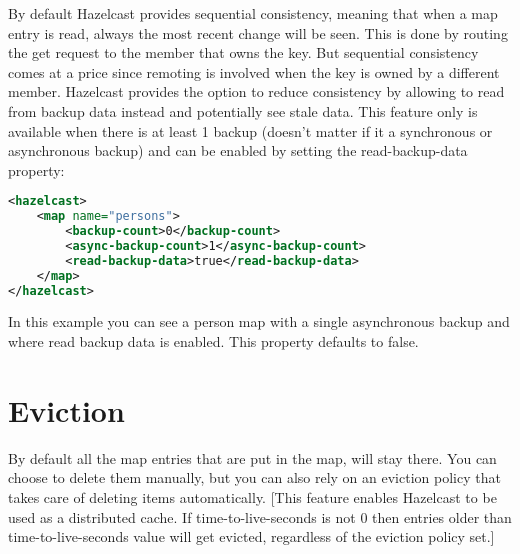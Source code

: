 By default Hazelcast provides sequential consistency, meaning that when a map entry is read, always the most recent change will be seen. This is done by routing the get request to the member that owns the key. But sequential consistency comes at a price since remoting is involved when the key is owned by a different member. Hazelcast provides the option to reduce consistency by allowing to read from backup data instead and potentially see stale data. This feature only is available when there is at least 1 backup (doesn't matter if it a synchronous or asynchronous backup) and can be enabled by setting the read-backup-data property:
\begin{lstlisting}[language=xml]
<hazelcast>
    <map name="persons">
        <backup-count>0</backup-count>
        <async-backup-count>1</async-backup-count>
        <read-backup-data>true</read-backup-data>
    </map>
</hazelcast>
\end{lstlisting}
In this example you can see a person map with a single asynchronous backup and where read backup data is enabled. This property defaults to false.

\section{Eviction}
By default all the map entries that are put in the map, will stay there. You can choose to delete them manually, but you can also rely on an eviction policy that takes care of deleting items automatically. 
[This feature enables Hazelcast to be used as a distributed cache. If time-to-live-seconds is not 0 then entries older than time-to-live-seconds value will get evicted, regardless of the eviction policy set.]

